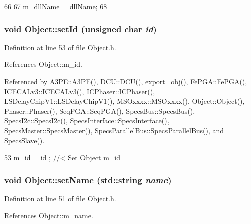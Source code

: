 \begin{DoxyCode}
66                                       {
67     m_dllName = dllName;
68   }
\end{DoxyCode}
\hypertarget{classObject_a398fe08cba594a0ce6891d59fe4f159f}{
\subsubsection[{setId}]{\setlength{\rightskip}{0pt plus 5cm}void Object::setId (unsigned char {\em id})}}
\label{classObject_a398fe08cba594a0ce6891d59fe4f159f}


Definition at line 53 of file Object.h.

References Object::m\_\-id.

Referenced by A3PE::A3PE(), DCU::DCU(), export\_\-obj(), FePGA::FePGA(), ICECALv3::ICECALv3(), ICPhaser::ICPhaser(), LSDelayChipV1::LSDelayChipV1(), MSOxxxx::MSOxxxx(), Object::Object(), Phaser::Phaser(), SeqPGA::SeqPGA(), SpecsBus::SpecsBus(), SpecsI2c::SpecsI2c(), SpecsInterface::SpecsInterface(), SpecsMaster::SpecsMaster(), SpecsParallelBus::SpecsParallelBus(), and SpecsSlave().


\begin{DoxyCode}
53 { m_id    = id    ; } //< Set Object m_id
\end{DoxyCode}
\hypertarget{classObject_ae30fea75683c2d149b6b6d17c09ecd0c}{
\subsubsection[{setName}]{\setlength{\rightskip}{0pt plus 5cm}void Object::setName (std::string {\em name})}}
\label{classObject_ae30fea75683c2d149b6b6d17c09ecd0c}


Definition at line 51 of file Object.h.

References Object::m\_\-name.

